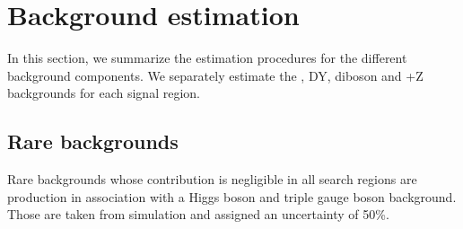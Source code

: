 \section{Background estimation}
\label{sec:background_estimations}
In this section, we summarize the estimation procedures for the different background components. We separately estimate the \ttbar, DY, diboson and \ttbar+Z backgrounds for
each signal region. 
  
  
  
\subsection{Rare backgrounds}
Rare backgrounds whose contribution is negligible in all search regions are \ttbar production in association with a Higgs boson and triple gauge boson background.
Those are taken from simulation and assigned an uncertainty of 50\%.
